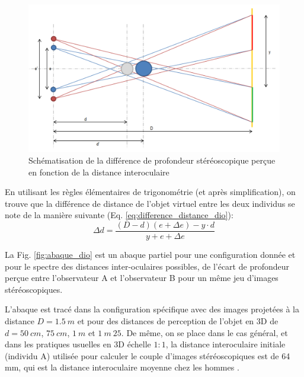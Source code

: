 	\begin{figure}
		\centering
		\includegraphics[scale=.5]{Figures/ProfondeurStereoDIO}
		\caption{Schématisation de la différence de profondeur stéréoscopique perçue en fonction de la distance interoculaire}
		\label{fig:profondeur_stereo_dio}
	\end{figure}

	\par En utilisant les règles élémentaires de trigonométrie (et après simplification), on trouve que la différence de distance de l'objet virtuel entre les deux individus se note de la manière suivante (Eq. \ref{eq:difference_distance_dio}):
	\begin{equation}
		\Delta d = \frac{(D - d)(e + \Delta e) - y \cdot d}{y + e + \Delta e}
		\label{eq:difference_distance_dio} 
	\end{equation}
	
	\par La Fig. \ref{fig:abaque_dio} est un abaque partiel pour une configuration donnée et pour le spectre des distances inter-oculaires possibles, de l'écart de profondeur perçue entre l'observateur A et l'observateur B pour un même jeu d'images stéréoscopiques.
	
	\par L'abaque est tracé dans la configuration spécifique avec des images projetées à la distance $D = 1.5~m$ et pour des distances de perception de l'objet en 3D de $d = 50~cm$, $75~cm$, $1~m$ et $1~m~25$. De même, on se place dans le cas général, et dans les pratiques usuelles en 3D échelle $1:1$, la distance interoculaire initiale (individu A) utilisée pour calculer le couple d'images stéréoscopiques est de 64 mm, qui est la distance interoculaire moyenne chez les hommes \citep{dodgson_variation_2004}.
	
